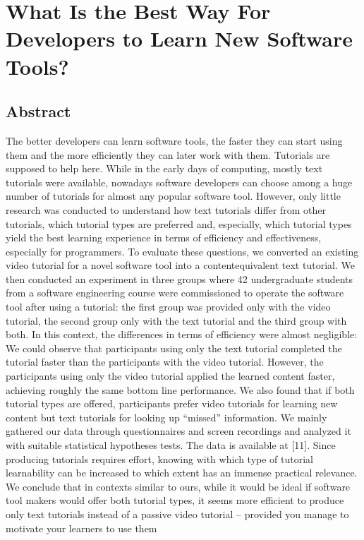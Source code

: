\section{What Is the Best Way For Developers to Learn New Software Tools?}

\subsection{Abstract}

The better developers can learn software tools, the faster they can start using them and the more efficiently they can later work with them. Tutorials are supposed to help here. While in the early days of computing, mostly text tutorials were available, nowadays software developers can choose among a huge number of tutorials for almost any popular software tool. However, only little research was conducted to understand how text tutorials differ from other tutorials, which tutorial types are preferred and, especially, which tutorial types yield the best learning experience in terms of efficiency and effectiveness, especially for programmers. To evaluate these questions, we converted an existing video tutorial for a novel software tool into a contentequivalent text tutorial. We then conducted an experiment in three groups where 42 undergraduate students from a software engineering course were commissioned to operate the software tool after using a tutorial: the first group was provided only with the video tutorial, the second group only with the text tutorial and the third group with both. In this context, the differences in terms of efficiency were almost negligible: We could observe that participants using only the text tutorial completed the tutorial faster than the participants with the video tutorial. However, the participants using only the video tutorial applied the learned content faster, achieving roughly the same bottom line performance. We also found that if both tutorial types are offered, participants prefer video tutorials for learning new content but text tutorials for looking up “missed” information. We mainly gathered our data through questionnaires and screen recordings and analyzed it with suitable statistical hypotheses tests. The data is available at [11]. Since producing tutorials requires effort, knowing with which type of tutorial learnability can be increased to which extent has an immense practical relevance. We conclude that in contexts similar to ours, while it would be ideal if software tool makers would offer both tutorial types, it seems more efficient to produce only text tutorials instead of a passive video tutorial – provided you manage to motivate your learners to use them

